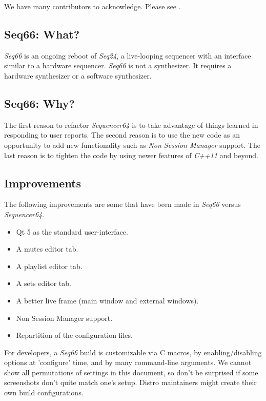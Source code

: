 \documentclass[
 11pt,
 twoside,
 a4paper,
 headinclude,
 footinclude,
 final                                 %
]{article}
\begin{document}
   We have many contributors to acknowledge.
   Please see .

\subsection{Seq66: What?}
\label{subsec:what_is_seq66}

   \textsl{Seq66} is an ongoing reboot of \textsl{Seq24},
   a live-looping sequencer with an interface similar to a hardware sequencer.
   \textsl{Seq66} is not a synthesizer.  It requires a hardware
   synthesizer or a software synthesizer.

\subsection{Seq66: Why?}
\label{subsec:introduction_vs_others}

   The first reason to refactor \textsl{Sequencer64} is to take advantage of
   things learned in responding to user reports.  The second reason is to use
   the new code as an opportunity to add new functionality such as
   \textsl{Non Session Manager} support.  The last reason is to tighten the
   code by using newer features of \textsl{C++11} and beyond.

\subsection{Improvements}
\label{subsec:improvements}

   The following improvements are some that have been made in
   \textsl{Seq66} versus \textsl{Sequencer64}.

   \begin{itemize}
      \item Qt 5 as the standard user-interface.
      \item A mutes editor tab.
      \item A playlist editor tab.
      \item A sets editor tab.
      \item A better live frame (main window and external windows).
      \item Non Session Manager support.
      \item Repartition of the configuration files.
   \end{itemize}

   For developers, a \textsl{Seq66} build is customizable via C macros,
   by enabling/disabling options at 'configure' time, and by many
   command-line arguments.  We cannot show all permutations of settings in this
   document, so don't be surprised if some screenshots don't quite match
   one's setup.  Distro maintainers might create their own build
   configurations.
\end{document}
